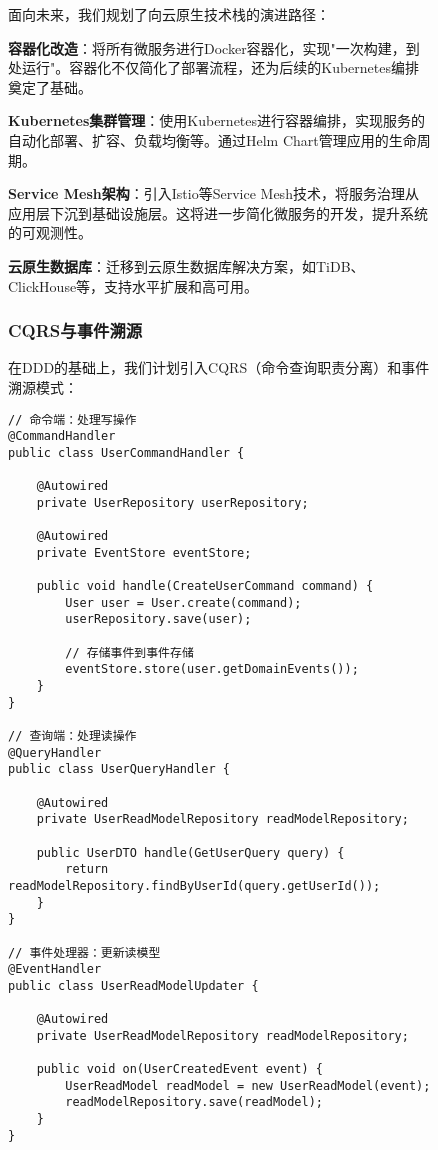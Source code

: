 \documentclass[a4paper,12pt]{article}
\begin{document}
\begin{figure}[H]
面向未来，我们规划了向云原生技术栈的演进路径：

\textbf{容器化改造}：将所有微服务进行Docker容器化，实现"一次构建，到处运行"。容器化不仅简化了部署流程，还为后续的Kubernetes编排奠定了基础。

\textbf{Kubernetes集群管理}：使用Kubernetes进行容器编排，实现服务的自动化部署、扩容、负载均衡等。通过Helm Chart管理应用的生命周期。

\textbf{Service Mesh架构}：引入Istio等Service Mesh技术，将服务治理从应用层下沉到基础设施层。这将进一步简化微服务的开发，提升系统的可观测性。

\textbf{云原生数据库}：迁移到云原生数据库解决方案，如TiDB、ClickHouse等，支持水平扩展和高可用。

\subsubsection{CQRS与事件溯源}

在DDD的基础上，我们计划引入CQRS（命令查询职责分离）和事件溯源模式：

\begin{lstlisting}[caption=CQRS架构设计]
// 命令端：处理写操作
@CommandHandler
public class UserCommandHandler {
    
    @Autowired
    private UserRepository userRepository;
    
    @Autowired
    private EventStore eventStore;
    
    public void handle(CreateUserCommand command) {
        User user = User.create(command);
        userRepository.save(user);
        
        // 存储事件到事件存储
        eventStore.store(user.getDomainEvents());
    }
}

// 查询端：处理读操作
@QueryHandler  
public class UserQueryHandler {
    
    @Autowired
    private UserReadModelRepository readModelRepository;
    
    public UserDTO handle(GetUserQuery query) {
        return readModelRepository.findByUserId(query.getUserId());
    }
}

// 事件处理器：更新读模型
@EventHandler
public class UserReadModelUpdater {
    
    @Autowired
    private UserReadModelRepository readModelRepository;
    
    public void on(UserCreatedEvent event) {
        UserReadModel readModel = new UserReadModel(event);
        readModelRepository.save(readModel);
    }
}
\end{lstlisting}


\end{figure}
\end{document}
